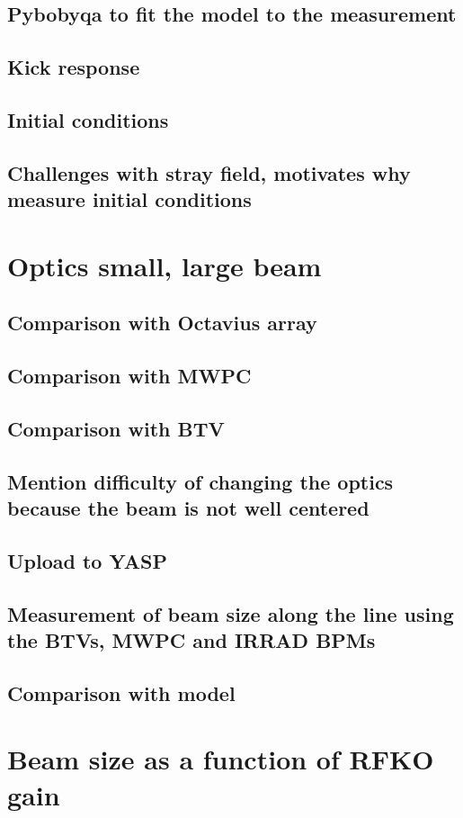 \documentclass[a4paper,
               ]{jacow}
\begin{document}
\subsection{Pybobyqa to fit the model to the measurement}
\subsection{Kick response}
\subsection{Initial conditions}
\subsection{Challenges with stray field, motivates why measure initial conditions}

\section{Optics small, large beam}
\subsection{Comparison with Octavius array}
\subsection{Comparison with MWPC}
\subsection{Comparison with BTV}
\subsection{Mention difficulty of changing the optics because the beam is not well centered}
\subsection{Upload to YASP}
\subsection{Measurement of beam size along the line using the BTVs, MWPC and IRRAD BPMs}
\subsection{Comparison with model}

\section{Beam size as a function of RFKO gain}
\end{document}
